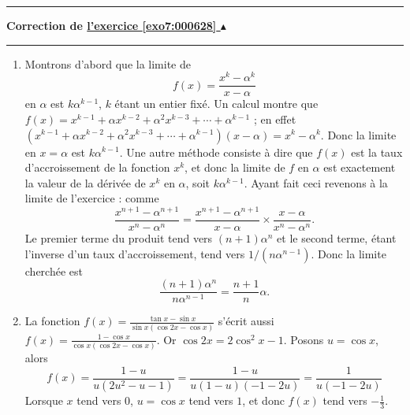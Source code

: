 \documentclass[11pt,a4paper]{article}
\newcounter{exo}
\newcommand{\correction}[1]{\hypertarget{cor7:#1}{}\label{cor7:#1}{\bf Correction de \hyperlink{exo7:#1}{l'exercice \ref{exo7:#1} $\blacktriangle$}}\vspace{1mm}\hrule\vspace{1mm}}
\newcommand{\fincorrection}{\vspace{1mm}\hrule\vspace*{7mm}}
\begin{document}
\fincorrection
\correction{000628}
\begin{enumerate}
  \item Montrons d'abord que la limite de $$f(x) = \frac{x^k-\alpha^k}{x-\alpha}$$ en $\alpha$ est 
$k\alpha^{k-1}$, $k$ étant un entier fixé. Un calcul montre que 
$f(x) = x^{k-1} + \alpha x^{k-2} + \alpha^2x^{k-3} + \cdots + \alpha^{k-1}$ ;
en effet $(x^{k-1} + \alpha x^{k-2} + \alpha^2x^{k-3} + \cdots + \alpha^{k-1})(x-\alpha) = x^k-\alpha^k$.
Donc la limite en $x=\alpha$ est $k\alpha^{k-1}$.
Une autre m\'ethode consiste \`a dire que $f(x)$ est la taux d'accroissement de la fonction $x^k$, et donc la limite de
$f$ en $\alpha$ est exactement la valeur de la d\'eriv\'ee de $x^k$ en $\alpha$, soit $k\alpha^{k-1}$.
Ayant fait ceci revenons \`a la limite de l'exercice : comme 
$$
\frac{x^{n+1}-\alpha^{n+1}}{x^n-\alpha^n} = \frac{x^{n+1}-\alpha^{n+1}}{x-\alpha} \times \frac{x-\alpha}{x^n-\alpha^n}.$$
Le premier terme du produit tend vers $(n+1)\alpha^n$ et le second
terme, \'etant l'inverse d'un taux d'accroissement, tend vers $1/(n\alpha^{n-1})$.
Donc la limite cherch\'ee est 
$$\frac {(n+1)\alpha^n}{n\alpha^{n-1}}= \frac {n+1}{n} \alpha.$$
  \item La fonction $f(x)=\frac{\tan x - \sin x}{\sin x(\cos 2x - \cos x)}$ s'\'ecrit aussi $f(x) = \frac{1-\cos x}{\cos x (\cos 2x- \cos x)}$. Or $\cos 2x =  2\cos^2 x - 1$. Posons $u = \cos x$, alors 
$$f(x) = \frac {1-u}{u(2u^2-u-1)} = \frac {1-u}{u(1-u)(-1-2u)}= \frac {1}{u(-1-2u)}$$
Lorsque $x$ tend vers $0$, $u = \cos x$ tend vers $1$, et donc $f(x)$ tend vers $-\frac 13$.


\end{enumerate}
\end{document}
